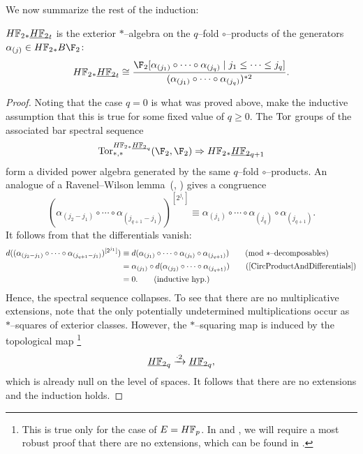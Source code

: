 We now summarize the rest of the induction:
\begin{theorem}\label{UnstableSteenrodInduction}
\(\HFtwo_* \OS{\HFtwo}{t}\) is the exterior \(\ast\)--algebra on the \(q\)--fold \(\circ\)--products of the generators \(\alpha_{(j)} \in \HFtwo_* B\F_2\): \[\HFtwo_* \OS{\HFtwo}{t} \cong \frac{\F_2[\alpha_{(j_1)} \circ \cdots \circ \alpha_{(j_q)} \mid j_1 \le \cdots \le j_q]}{(\alpha_{(j_1)} \circ \cdots \circ \alpha_{(j_q)})^{\ast 2}}.\]
\end{theorem}
\begin{proof}
Noting that the case \(q = 0\) is what was proved above, make the inductive assumption that this is true for some fixed value of \(q \ge 0\).
The \(\operatorname{Tor}\) groups of the associated bar spectral sequence \[\Tor^{\HFtwo_* \OS{\HFtwo}{q}}_{*, *}(\F_2, \F_2) \Rightarrow \HFtwo_* \OS{\HFtwo}{q+1}\] form a divided power algebra generated by the same \(q\)--fold \(\circ\)--products.
An analogue of a Ravenel--Wilson lemma~(\cite[Lemma 9.5]{RavenelWilsonKthyOfEMSpaces}, \cite[Claim 8.16]{Wilson}) gives a congruence \[(\alpha_{(j_2-j_1)} \circ \cdots \circ \alpha_{(j_{q+1}-j_1)})^{[2^{j_1}]} \equiv \alpha_{(j_1)} \circ \cdots \circ \alpha_{(j_q)} \circ \alpha_{(j_{q+1})} \tag{mod \(\ast\)--decomposables}.\]
It follows from  that the differentials vanish:
\begin{align*}
d((\alpha_{(j_2-j_1)} \circ \cdots \circ \alpha_{(j_{q+1}-j_1)})^{[2^{j_1}]}) & \equiv d(\alpha_{(j_1)} \circ \cdots \circ \alpha_{(j_t)} \circ \alpha_{(j_{q+1})}) \tag{mod \(\ast\)--decomposables} \\
& = \alpha_{(j_1)} \circ d(\alpha_{(j_2)} \circ \cdots \circ \alpha_{(j_{q+1})}) \tag{\Cref{CircProductAndDifferentials}} \\
& = 0. \tag{inductive hyp.}
\end{align*}
Hence, the spectral sequence collapses.
To see that there are no multiplicative extensions, note that the only potentially undetermined multiplications occur as \(\ast\)--squares of exterior classes.
However, the \(\ast\)--squaring map is induced by the topological map%
\footnote{%
This is true only for the case of \(E = \HFp\).
In  and , we will require a most robust proof that there are no extensions, which can be found in \cite[Proof of 8.11]{Wilson}.
}
\[\OS{\HFtwo}{q} \xrightarrow{\cdot 2} \OS{\HFtwo}{q},\]
which is already null on the level of spaces.
It follows that there are no extensions and the induction holds.
\end{proof}

